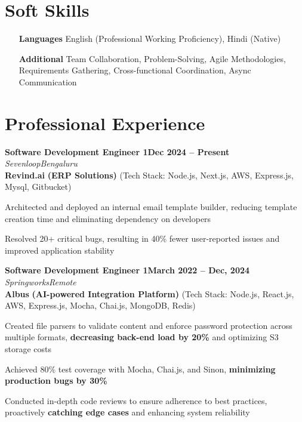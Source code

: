 \documentclass[letterpaper, 10pt]{article}
\newcommand{\heading}[2]{ \hspace{6pt}#1\hfill#2\\[0.8pt] }
\newcommand{\headingBf}[2]{ \heading{\textbf{#1}}{\textbf{#2}} }
\newcommand{\headingIt}[2]{ \heading{\textit{#1}}{\textit{#2}} }
\newenvironment{resume_list}{
\vspace{-5pt}
\begin{itemize}[itemsep=-3pt, parsep=0.2pt, leftmargin=20pt] }{ \end{itemize}
\vspace{-4pt}
}
\begin{document}
\section{Soft Skills}
\begin{itemize}[itemsep=-2pt, parsep=0.5pt, leftmargin=70pt]
	\item[\textbf{Languages}] English (Professional Working Proficiency), Hindi
	      (Native)
	      
	\item[\textbf{Additional}] Team Collaboration, Problem-Solving, Agile Methodologies,
	      Requirements Gathering, Cross-functional Coordination, Async Communication
\end{itemize}

\section{Professional Experience}
\headingBf{Software Development Engineer 1}{Dec 2024 -- Present}
\vspace{1pt}
\headingIt{Sevenloop}{Bengaluru}
\vspace{2pt}
\hspace{10pt}\textbf{Revind.ai} \textbf{(ERP Solutions)} \small{(Tech Stack: Node.js, Next.js, AWS, Express.js, Mysql, Gitbucket)}
\vspace{1pt}
\begin{resume_list}
	\item Architected and deployed an internal email template builder, reducing template creation time and eliminating dependency on developers
\end{resume_list}
\begin{resume_list}
	\item Resolved 20+ critical bugs, resulting in 40\% fewer user-reported issues and improved application stability
\end{resume_list}

\vspace{2pt}

\headingBf{Software Development Engineer 1}{March 2022 -- Dec, 2024}
\vspace{1pt}
\headingIt{Springworks}{Remote}
\vspace{2pt}
\hspace{10pt}\textbf{Albus} \textbf{(AI-powered Integration Platform)} \small{(Tech Stack: Node.js, React.js, AWS, Express.js, Mocha, Chai.js, MongoDB, Redis)}
\vspace{1pt}
\begin{resume_list}
	\item Created file parsers to validate
	content and enforce password protection across multiple formats, \textbf{decreasing
	back-end load by 20\%} and optimizing S3 storage costs \item Achieved 80\%
	test coverage with Mocha, Chai.js, and Sinon, \textbf{minimizing production bugs by 30\%}
	\item Conducted in-depth code reviews to ensure adherence to best practices,
	proactively \textbf{catching edge cases} and enhancing system reliability
\end{resume_list}
\end{document}
